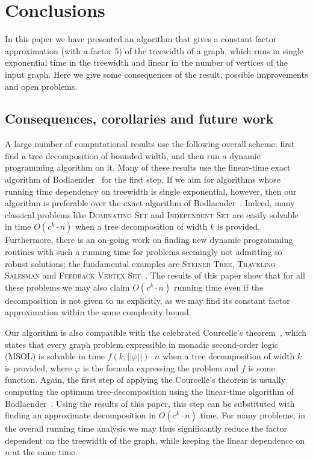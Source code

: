 \documentclass[a4paper,11pt]{article}
\theoremstyle{definition}
\theoremstyle{remark}
\begin{document}
\section{Conclusions}
\label{section:conclusions}
In this paper we have presented an algorithm that gives a constant
factor approximation (with a factor 5) of the treewidth of a graph,
which runs in single exponential time in the treewidth and linear in
the number of vertices of the input graph.  Here we give some
consequences of the result, possible improvements and open problems.

\subsection{Consequences, corollaries and future work}
A large number of computational results use the following overall
scheme: first find a tree decomposition of bounded width, and then run
a dynamic programming algorithm on it.  Many of these results use the
linear-time exact algorithm of Bodlaender~\cite{Bodlaender96} for the
first step.
If we aim for algorithms whose running time dependency on treewidth is
single exponential, however, then our algorithm is preferable over the
exact algorithm of Bodlaender~\cite{Bodlaender96}.  Indeed, many
classical problems like \textsc{Dominating Set} and
\textsc{Independent Set} are easily solvable in time $O(c^k\cdot n)$
when a tree decomposition of width $k$ is provided.  Furthermore,
there is an on-going work on finding new dynamic programming routines
with such a running time for problems seemingly not admitting so
robust solutions; the fundamental examples are \textsc{Steiner Tree},
\textsc{Traveling Salesman} and \textsc{Feedback Vertex
  Set}~\cite{BodlaenderCKN12}.  The results of this paper show that
for all these problems we may also claim $O(c^k\cdot n)$ running time
even if the decomposition is not given to us explicitly, as we may
find its constant factor approximation within the same complexity
bound.

Our algorithm is also compatible with the celebrated Courcelle's
theorem~\cite{Courcelle90}, which states that every graph problem
expressible in monadic second-order logic (MSOL) is solvable in time
$f(k,||\varphi||)\cdot n$ when a tree decomposition of width $k$ is
provided, where $\varphi$ is the formula expressing the problem and
$f$ is some function.  Again, the first step of applying the
Courcelle's theorem is usually computing the optimum
tree-decomposition using the linear-time algorithm of
Bodlaender~\cite{Bodlaender96}.  Using the results of this paper, this
step can be substituted with finding an approximate decomposition in
$O(c^k\cdot n)$ time.  For many problems, in the overall running time
analysis we may thus significantly reduce the factor dependent on the
treewidth of the graph, while keeping the linear dependence on $n$ at
the same time.
\end{document}
